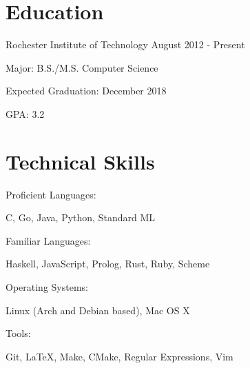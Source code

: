 \documentclass[a4paper,margin,line]{resume}
\newcommand{\rdate}[1]{\hfill {\small #1}}
\begin{document}
\begin{resume}

\section{\mysidestyle Education}
\begin{compactdesc}
    \item[Rochester Institute of Technology] \rdate{August 2012 - Present}
    \begin{asparablank} { \small
        \item Major: B.S./M.S. Computer Science
        \item Expected Graduation: December 2018
        \item GPA: 3.2
    } \end{asparablank}
\end{compactdesc}

\section{\mysidestyle Technical Skills}
\begin{compactdesc}
    \item[Proficient Languages:]
    \begin{asparablank} {\small
        \item C, Go, Java, Python, Standard ML
    } \end{asparablank}

    \item[Familiar Languages:]
    \begin{asparablank} {\small
        \item Haskell, JavaScript, Prolog, Rust, Ruby, Scheme
    } \end{asparablank}

    \item[Operating Systems:]
    \begin{asparablank} {\small
        \item Linux (Arch and Debian based), Mac OS X
    } \end{asparablank}

    \item[Tools:]
    \begin{asparablank} { \small
        \item Git, \LaTeX, Make, CMake, Regular Expressions, Vim
    } \end{asparablank}
\end{compactdesc}


\end{resume}
\end{document}
